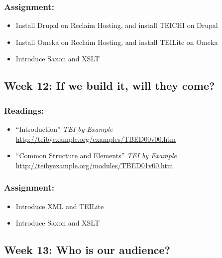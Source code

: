 \documentclass[]{article}
\begin{document}
\subsubsection{Assignment:}\label{assignment-9}

\begin{itemize}
\itemsep1pt\parskip0pt
\item
  Install Drupal on Reclaim Hosting, and install TEICHI on Drupal
\item
  Install Omeka on Reclaim Hosting, and install TEILite on Omeka
\item
  Introduce Saxon and XSLT
\end{itemize}

\subsection{Week 12: If we build it, will they
come?}\label{week-12-if-we-build-it-will-they-come}

\subsubsection{Readings:}\label{readings-10}

\begin{itemize}
\itemsep1pt\parskip0pt
\item
  ``Introduction'' \emph{TEI by Example}
  \url{http://teibyexample.org/examples/TBED00v00.htm}
\item
  ``Common Structure and Elements'' \emph{TEI by Example}
  \url{http://teibyexample.org/modules/TBED01v00.htm}
\end{itemize}

\subsubsection{Assignment:}\label{assignment-10}

\begin{itemize}
\itemsep1pt\parskip0pt
\item
  Introduce XML and TEILite
\item
  Introduce Saxon and XSLT
\end{itemize}

\subsection{Week 13: Who is our
audience?}\label{week-13-who-is-our-audience}
\end{document}
